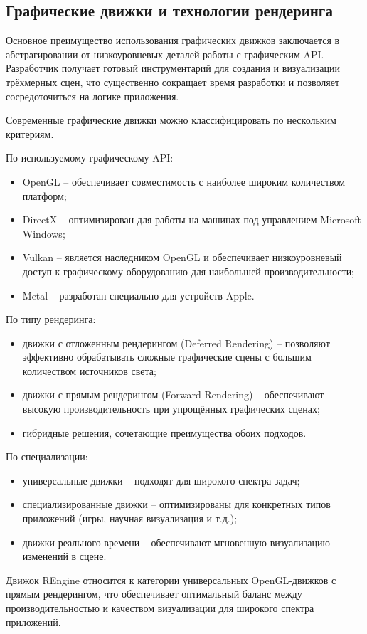 \subsection{Графические движки и технологии рендеринга}

Основное преимущество использования графических движков заключается в абстрагировании от низкоуровневых деталей работы с графическим API. Разработчик получает готовый инструментарий для создания и визуализации трёхмерных сцен, что существенно сокращает время разработки и позволяет сосредоточиться на логике приложения.

Современные графические движки можно классифицировать по нескольким критериям.

По используемому графическому API:
\begin{itemize}
    \item OpenGL -- обеспечивает совместимость с наиболее широким количеством платформ;
    \item DirectX -- оптимизирован для работы на машинах под управлением Microsoft Windows;
    \item Vulkan -- является наследником OpenGL и обеспечивает низкоуровневый доступ к графическому оборудованию для наибольшей производительности;
    \item Metal -- разработан специально для устройств Apple.
\end{itemize}

По типу рендеринга:
\begin{itemize}
    \item движки с отложенным рендерингом (Deferred Rendering) -- позволяют эффективно обрабатывать сложные графические сцены с большим количеством источников света;
    \item движки с прямым рендерингом (Forward Rendering) -- обеспечивают высокую производительность при упрощённых графических сценах;
    \item гибридные решения, сочетающие преимущества обоих подходов.
\end{itemize}

По специализации:
\begin{itemize}
    \item универсальные движки -- подходят для широкого спектра задач;
    \item специализированные движки -- оптимизированы для конкретных типов приложений (игры, научная визуализация и т.д.);
    \item движки реального времени -- обеспечивают мгновенную визуализацию изменений в сцене.
\end{itemize}

Движок REngine относится к категории универсальных OpenGL-движков с прямым рендерингом, что обеспечивает оптимальный баланс между производительностью и качеством визуализации для широкого спектра приложений.
